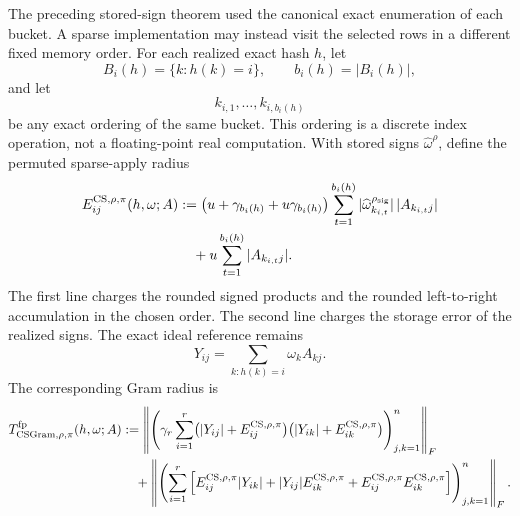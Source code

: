 \documentclass[11pt]{article}
\newcommand{\Frob}[1]{\left\lVert #1\right\rVert_F}
\theoremstyle{remark}
\begin{document}
The preceding stored-sign theorem used the canonical exact enumeration of each
bucket.  A sparse implementation may instead visit the selected rows in a
different fixed memory order.  For each realized exact hash \(h\), let
\[
  B_i(h)=\{k:h(k)=i\},\qquad b_i(h)=|B_i(h)|,
\]
and let
\[
  k_{i,1},\ldots,k_{i,b_i(h)}
\]
be any exact ordering of the same bucket.  This ordering is a discrete index
operation, not a floating-point real computation.  With stored signs
\(\widehat\omega^\rho\), define the permuted sparse-apply radius
\[
\begin{aligned}
  E^{{\rm CS},\rho,\pi}_{ij}(h,\omega;A)
  &:=
  \bigl(u+\gamma_{b_i(h)}+u\gamma_{b_i(h)}\bigr)
  \sum_{t=1}^{b_i(h)}
    |\widehat\omega^{\rho_{\rm sig}}_{k_{i,t}}|\,|A_{k_{i,t}j}|
  \\
  &\quad+
  u\sum_{t=1}^{b_i(h)}|A_{k_{i,t}j}|.
\end{aligned}
\]
The first line charges the rounded signed products and the rounded
left-to-right accumulation in the chosen order.  The second line charges the
storage error of the realized signs.  The exact ideal reference remains
\[
  Y_{ij}=\sum_{k:h(k)=i}\omega_k A_{kj}.
\]
The corresponding Gram radius is
\[
\begin{aligned}
  T_{{\rm CSGram},\rho,\pi}^{\rm fp}(h,\omega;A)
  &:=
  \Frob{
    \left(
      \gamma_r
      \sum_{i=1}^{r}
      \bigl(|Y_{ij}|+E^{{\rm CS},\rho,\pi}_{ij}\bigr)
      \bigl(|Y_{ik}|+E^{{\rm CS},\rho,\pi}_{ik}\bigr)
    \right)_{j,k=1}^{n}
  }
  \\
  &\quad+
  \Frob{
    \left(
      \sum_{i=1}^{r}
      \left[
        E^{{\rm CS},\rho,\pi}_{ij}|Y_{ik}|
        +
        |Y_{ij}|E^{{\rm CS},\rho,\pi}_{ik}
        +
        E^{{\rm CS},\rho,\pi}_{ij}E^{{\rm CS},\rho,\pi}_{ik}
      \right]
    \right)_{j,k=1}^{n}
  } .
\end{aligned}
\]
\end{document}
